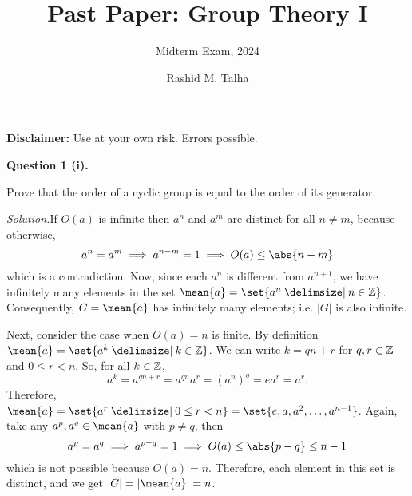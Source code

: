 \documentclass[11pt]{penrose}
\title{Past Paper: Group Theory I}
\subtitle{Midterm Exam, 2024}
\author{Rashid M. Talha}
\let\cyclic\mean
\begin{document}
\newenvironment{problem}[2][Question]{\textbf{#1 #2.}\par}{}
\newcommand{\solution}{\textit{Solution.}\hspace{2mm}}

\maketitle

\textbf{Disclaimer:} Use at your own risk. Errors possible.

\begin{problem}{1 (i)}
    Prove that the order of a cyclic group is equal to the order of its generator.

    \solution If $O(a)$ is infinite then $a^n$ and $a^m$ are distinct for all $n \neq m$, because otherwise,
    \begin{equation*}
        a^n = a^m \implies a^{n - m} = 1 \implies O(a) \leq \abs{n-m}
    \end{equation*}
    which is a contradiction. Now, since each $a^n$ is different from $a^{n+1}$, we have infinitely many elements in the set $\cyclic{a} = \set{a^n \st n \in \Z}$. Consequently, $G = \cyclic{a}$ has infinitely many elements; i.e. $|G|$ is also infinite.

    Next, consider the case when $O(a) = n$ is finite. By definition $\cyclic{a} = \set{a^k \st k \in \Z}$. We can write $k = qn + r$ for $q, r \in \mathbb{Z}$ and $0 \leq r < n$. So, for all $k \in \mathbb{Z}$,
    \begin{equation*}
        a^k = a^{qn+r} = a^{qn} a^r = (a^{n})^{q} = e a^r = a^r.
    \end{equation*}
    Therefore, $\cyclic{a} = \set{a^r \st 0 \leq r < n} = \set{e, a, a^2, \dots, a^{n-1}}$. Again, take any $a^p, a^q \in \cyclic{a}$ with $p \neq q$, then
    \begin{equation*}
        a^p = a^q \implies a^{p - q} = 1 \implies O(a) \leq \abs{p-q} \leq n-1
    \end{equation*}
    which is not possible because $O(a) = n$. Therefore, each element in this set is distinct, and we get $|G| = |\cyclic{a}| = n$.
\end{problem}
\end{document}
